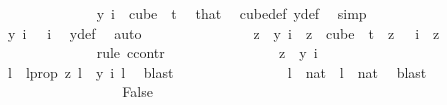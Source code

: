 \begin{isabellebody}
\ \ \ \ \ \ \ \ \ \ \ \ \isamarkupfalse%
\ {\isachardoublequoteopen}y\ i\ {\isasymin}\ {\isacharparenleft}{\kern0pt}cube\ {}\ t{\isacharparenright}{\kern0pt}{\isachardoublequoteclose}\ \isamarkupfalse%
\ that\ \isamarkupfalse%
\ cube{\isacharunderscore}{\kern0pt}def\ y{\isacharunderscore}{\kern0pt}def\ \isamarkupfalse%
\ simp\isanewline
\ \ \ \ \ \ \ \ \ \ \ \ \isamarkupfalse%
\ \isamarkupfalse%
\ {\isachardoublequoteopen}y\ i\ {}\ {\isacharequal}{\kern0pt}\ i{\isachardoublequoteclose}\ \isamarkupfalse%
\ y{\isacharunderscore}{\kern0pt}def\ \isamarkupfalse%
\ auto\isanewline
\ \ \ \ \ \ \ \ \ \ \ \ \isamarkupfalse%
\ \isamarkupfalse%
\ {\isachardoublequoteopen}z\ {\isacharequal}{\kern0pt}\ y\ i{\isachardoublequoteclose}\ \ {\isachardoublequoteopen}z\ {\isasymin}\ cube\ {}\ t{\isachardoublequoteclose}\ \ {\isachardoublequoteopen}z\ {}\ {\isacharequal}{\kern0pt}\ i{\isachardoublequoteclose}\ \ z\isanewline
\ \ \ \ \ \ \ \ \ \ \ \ \isamarkupfalse%
\ {\isacharparenleft}{\kern0pt}rule\ ccontr{\isacharparenright}{\kern0pt}\isanewline
\ \ \ \ \ \ \ \ \ \ \ \ \ \ \isamarkupfalse%
\ {\isachardoublequoteopen}z\ {\isasymnoteq}\ y\ i{\isachardoublequoteclose}\ \isanewline
\ \ \ \ \ \ \ \ \ \ \ \ \ \ \isamarkupfalse%
\ \isamarkupfalse%
\ l\ \ l{\isacharunderscore}{\kern0pt}prop{\isacharcolon}{\kern0pt}\ {\isachardoublequoteopen}z\ l\ {\isasymnoteq}\ y\ i\ l{\isachardoublequoteclose}\ \isamarkupfalse%
\ blast\isanewline
\ \ \ \ \ \ \ \ \ \ \ \ \ \ \isamarkupfalse%
\ {\isachardoublequoteopen}l\ {\isasymin}\ {\isacharbraceleft}{\kern0pt}{\isachardot}{\kern0pt}{\isachardot}{\kern0pt}{\isacharless}{\kern0pt}{}{\isacharcolon}{\kern0pt}{\isacharcolon}{\kern0pt}nat{\isacharbraceright}{\kern0pt}{\isachardoublequoteclose}\ {\isacharbar}{\kern0pt}\ {\isachardoublequoteopen}l\ {\isasymnotin}\ {\isacharbraceleft}{\kern0pt}{\isachardot}{\kern0pt}{\isachardot}{\kern0pt}{\isacharless}{\kern0pt}{}{\isacharcolon}{\kern0pt}{\isacharcolon}{\kern0pt}nat{\isacharbraceright}{\kern0pt}{\isachardoublequoteclose}\ \isamarkupfalse%
\ blast\isanewline
\ \ \ \ \ \ \ \ \ \ \ \ \ \ \isamarkupfalse%
\ \isamarkupfalse%
\ False\isanewline

\end{isabellebody}
